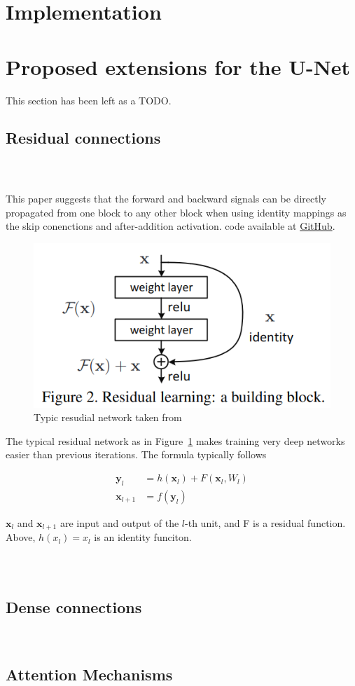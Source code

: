 \documentclass[11pt]{article}
\begin{document}
\section{Implementation}

\section{Proposed extensions for the U-Net}

This section has been left as a TODO.

\subsection{Residual connections}

\subsubsection{~\cite{identity-mappings-drns}}

This paper suggests that the forward and backward signals can be directly propagated from one block to any other block when using identity mappings as the skip conenctions and after-addition activation. code available at \href{https://github.com/KaimingHe/resnet-1k-layers/blob/master/resnet-pre-act.lua}{GitHub}.

\begin{figure}[H]
    \centering
    \includegraphics[width=0.4\linewidth]{images/residualArchitecture.png}
    \caption{Typic resudial network taken from~\cite{drn-for-image-recognition}}
   \label{residual-architecture}
\end{figure}

The typical residual network as in Figure~\ref{residual-architecture} makes training very deep networks easier than previous iterations. The formula typically follows 

\begin{align}
    \textbf{y}_l &= h(\textbf{x}_l) + F(\textbf{x}_l, W_l) \\
    \textbf{x}_{l+1} &= f(\textbf{y}_l)
\end{align}

$\textbf{x}_l$ and $\textbf{x}_{l+1}$ are input and output of the $l$-th unit, and F is a residual function. Above, 
$h(x_l)=x_l$ is an identity funciton. 

\subsubsection{~\cite{v-net}}

\subsection{Dense connections}

~\cite{tiramisu-densenet}

\subsection{Attention Mechanisms}

~\cite{attention-u-net}

\printbibliography
\end{document}
